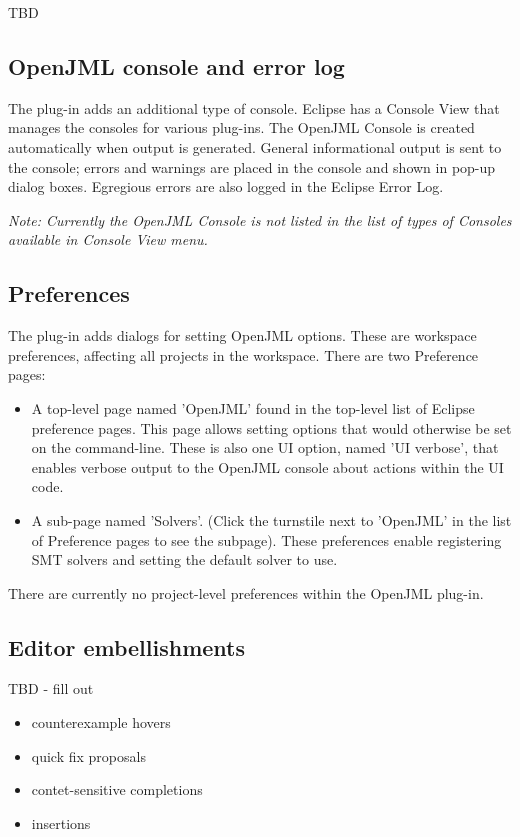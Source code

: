 TBD

\subsection{OpenJML console and error log}
The plug-in adds an additional type of console. Eclipse has a Console View that manages the consoles for various plug-ins. The OpenJML Console is created automatically when output is generated. General informational output is sent to the console; errors and warnings are placed in the console and shown in pop-up dialog boxes. Egregious errors are also logged in the Eclipse Error Log.

\textit{Note: Currently the OpenJML Console is not listed in the list of types of Consoles available in Console View menu.}

\subsection{Preferences}

The plug-in adds dialogs for setting OpenJML options. These are workspace preferences, affecting all projects in the workspace. There are two Preference pages:
\begin{itemize}[noitemsep,nolistsep]
\item A top-level page named 'OpenJML' found in the top-level list of Eclipse preference pages. This page allows setting options that would otherwise be set on the command-line. These is also one UI option, named 'UI verbose', that enables verbose output to the OpenJML console about actions within the UI code. 
\item A sub-page named 'Solvers'. (Click the turnstile next to 'OpenJML' in the list of Preference pages to see the subpage). These preferences enable registering SMT solvers and setting the default solver to use.
\end{itemize}

There are currently no project-level preferences within the OpenJML plug-in.

\subsection{Editor embellishments}

TBD - fill out

\begin{itemize}
\item counterexample hovers
\item quick fix proposals
\item contet-sensitive completions
\item insertions
\end{itemize}

